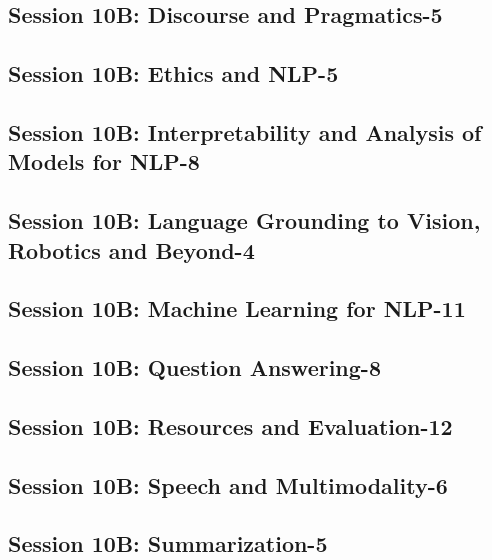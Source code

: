 \subsection{\large Session 10B: Discourse and Pragmatics-5}
\label{parallel-session-10B-trackA}
\TrackALoc\hfill\sessionchair{}{}
\clearpage
\subsection{\large Session 10B: Ethics and NLP-5}
\label{parallel-session-10B-trackB}
\TrackBLoc\hfill\sessionchair{}{}
\clearpage
\subsection{\large Session 10B: Interpretability and Analysis of Models for NLP-8}
\label{parallel-session-10B-trackC}
\TrackCLoc\hfill\sessionchair{}{}
\clearpage
\subsection{\large Session 10B: Language Grounding to Vision, Robotics and Beyond-4}
\label{parallel-session-10B-trackD}
\TrackDLoc\hfill\sessionchair{}{}
\clearpage
\subsection{\large Session 10B: Machine Learning for NLP-11}
\label{parallel-session-10B-trackE}
\TrackELoc\hfill\sessionchair{}{}
\clearpage
\subsection{\large Session 10B: Question Answering-8}
\label{parallel-session-10B-trackF}
\TrackFLoc\hfill\sessionchair{}{}
\clearpage
\subsection{\large Session 10B: Resources and Evaluation-12}
\label{parallel-session-10B-trackG}
\TrackGLoc\hfill\sessionchair{}{}
\clearpage
\subsection{\large Session 10B: Speech and Multimodality-6}
\label{parallel-session-10B-trackH}
\TrackHLoc\hfill\sessionchair{}{}
\clearpage
\subsection{\large Session 10B: Summarization-5}
\label{parallel-session-10B-trackI}
\TrackILoc\hfill\sessionchair{}{}
\clearpage


